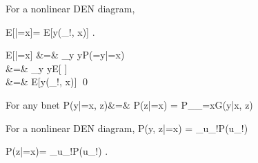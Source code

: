 \begin{claim}
For a nonlinear DEN diagram,

\beq
E[\rvy|\cald \rvx=x]=
E[y(\rvu_{!\rvx}, x)]
\;.
\eeq
\end{claim}
\proof

\beqa
E[\rvy|\cald \rvx=x]
&=&
\sum_{y}
yP(\rvy=y|\cald\rvx=x)
\\
&=&
\sum_{y}
yE[
\delta[y, y(u_{!\rvx},x)]]
\\
&=&
E[y(\rvu_{!\rvx}, x)]
\eeqa
\qed


For any bnet
\beqa
P(y|\cald\rvx=x, z)&=&
{P(z|\cald\rvx=x)}
=
P_{\cald_{\rvx=x}G}(y|x, z)
\eeqa

For a nonlinear DEN diagram,
\beq
P(y, z|\cald\rvx=x)
=
\sum_{u_{!\rvx}}P(u_{!\rvx})
\delta[y, y(u_{!\rvx},x)]
\delta[z, z(u_{!\rvx},x)]
\eeq

\beq
P(z|\cald\rvx=x)=
\sum_{u_{!\rvx}}P(u_{!\rvx})
\delta[z, z(u_{!\rvx},x)]
\;.
\eeq
